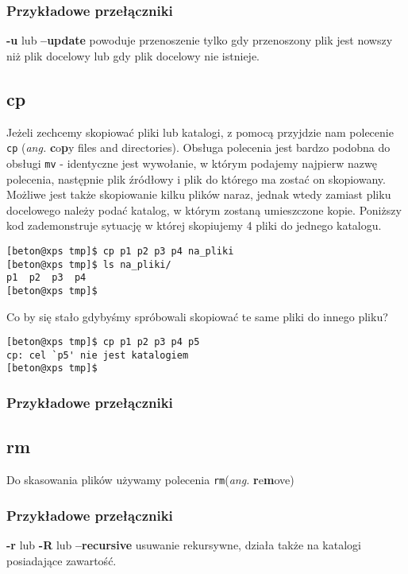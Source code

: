 \subsubsection*{Przykładowe przełączniki}
\begin{description}
\item \textbf{-u} lub \textbf{--update} powoduje przenoszenie tylko gdy przenoszony plik jest nowszy niż plik docelowy lub gdy plik docelowy nie istnieje.
\end{description}

\subsection{cp}
Jeżeli zechcemy skopiować pliki lub katalogi, z pomocą przyjdzie nam polecenie \texttt{cp} (\textit{ang.} \textbf{c}o\textbf{p}y files and directories). Obsługa polecenia jest bardzo podobna do obsługi \texttt{mv} - identyczne jest wywołanie, w którym podajemy najpierw nazwę polecenia, następnie plik źródłowy i plik do którego ma zostać on skopiowany. Możliwe jest także skopiowanie kilku plików naraz, jednak wtedy zamiast pliku docelowego należy podać katalog, w którym zostaną umieszczone kopie. Poniższy kod zademonstruje sytuację w której skopiujemy 4 pliki do jednego katalogu.
\begin{verbatim}
[beton@xps tmp]$ cp p1 p2 p3 p4 na_pliki
[beton@xps tmp]$ ls na_pliki/
p1  p2  p3  p4
[beton@xps tmp]$ 
\end{verbatim}
Co by się stało gdybyśmy spróbowali skopiować te same pliki do innego pliku?
\begin{verbatim}
[beton@xps tmp]$ cp p1 p2 p3 p4 p5
cp: cel `p5' nie jest katalogiem
[beton@xps tmp]$ 
\end{verbatim}
\subsubsection*{Przykładowe przełączniki}

\subsection{rm}
Do skasowania plików używamy polecenia \texttt{rm}(\textit{ang.} \textbf{r}e\textbf{m}ove)
\subsubsection*{Przykładowe przełączniki}
\begin{description}
\item \textbf{-r} lub \textbf{-R} lub \textbf{--recursive} usuwanie rekursywne, działa także na katalogi posiadające zawartość.
\end{description}

